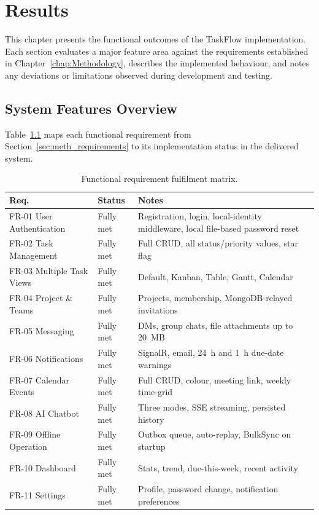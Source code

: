 ﻿\chapter{Results}\label{chap:results}

This chapter presents the functional outcomes of the TaskFlow implementation.
Each section evaluates a major feature area against the requirements established in
Chapter~\ref{chap:Methodology}, describes the implemented behaviour, and notes any
deviations or limitations observed during development and testing.

\section{System Features Overview}\label{sec:res_features}

Table~\ref{tab:feature_matrix} maps each functional requirement from
Section~\ref{sec:meth_requirements} to its implementation status in the delivered system.

\begin{table}[H]
\centering
\caption{Functional requirement fulfilment matrix.}
\label{tab:feature_matrix}
\begin{tabular}{llp{7.2cm}}
\toprule
\textbf{Req.} & \textbf{Status} & \textbf{Notes} \\
\midrule
FR-01 User Authentication  & Fully met    & Registration, login, local-identity middleware, local file-based password reset \\
FR-02 Task Management      & Fully met    & Full CRUD, all status/priority values, star flag \\
FR-03 Multiple Task Views  & Fully met    & Default, Kanban, Table, Gantt, Calendar \\
FR-04 Project \& Teams     & Fully met    & Projects, membership, MongoDB-relayed invitations \\
FR-05 Messaging            & Fully met    & DMs, group chats, file attachments up to 20~MB \\
FR-06 Notifications        & Fully met    & SignalR, email, 24~h and 1~h due-date warnings \\
FR-07 Calendar Events      & Fully met    & Full CRUD, colour, meeting link, weekly time-grid \\
FR-08 AI Chatbot           & Fully met    & Three modes, SSE streaming, persisted history \\
FR-09 Offline Operation    & Fully met    & Outbox queue, auto-replay, BulkSync on startup \\
FR-10 Dashboard            & Fully met    & Stats, trend, due-this-week, recent activity \\
FR-11 Settings             & Fully met    & Profile, password change, notification preferences \\
\bottomrule
\end{tabular}
\end{table}

